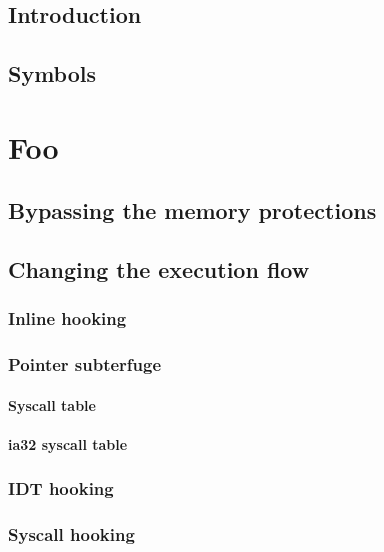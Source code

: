 \documentclass{article}
\begin{document}
\pagestyle{empty}
\titleAT
\tableofcontents
\clearpage
\pagestyle{fancy}

\section{Introduction}


\section{Symbols}


\chapter{Foo}
\section{Bypassing the memory protections}


\section{Changing the execution flow}
\subsection{Inline hooking}


\subsection{Pointer subterfuge}
\subsubsection{Syscall table}
\subsubsection{ia32 syscall table}

\subsection{IDT hooking}


\subsection{Syscall hooking}
\end{document}
